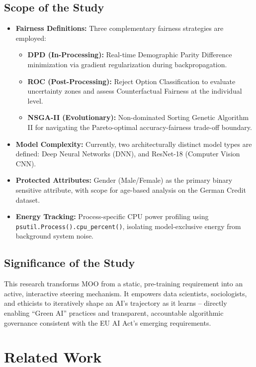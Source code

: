 \documentclass[12pt,a4paper]{article}
\begin{document}
\subsection{Scope of the Study}

\begin{itemize}
    \item \textbf{Fairness Definitions:} Three complementary fairness strategies are employed:
        \begin{itemize}
            \item \textbf{DPD (In-Processing):} Real-time Demographic Parity Difference minimization via gradient regularization during backpropagation.
            \item \textbf{ROC (Post-Processing):} Reject Option Classification to evaluate uncertainty zones and assess Counterfactual Fairness at the individual level.
            \item \textbf{NSGA-II (Evolutionary):} Non-dominated Sorting Genetic Algorithm II for navigating the Pareto-optimal accuracy-fairness trade-off boundary.
        \end{itemize}
    \item \textbf{Model Complexity:} Currently, two architecturally distinct model types are defined: Deep Neural Networks (DNN), and ResNet-18 (Computer Vision CNN).
    \item \textbf{Protected Attributes:} Gender (Male/Female) as the primary binary sensitive attribute, with scope for age-based analysis on the German Credit dataset.
    \item \textbf{Energy Tracking:} Process-specific CPU power profiling using \texttt{psutil.Process().cpu\_percent()}, isolating model-exclusive energy from background system noise.
\end{itemize}

\subsection{Significance of the Study}

This research transforms MOO from a static, pre-training requirement into an active, interactive steering mechanism. It empowers data scientists, sociologists, and ethicists to iteratively shape an AI's trajectory as it learns -- directly enabling ``Green AI'' practices and transparent, accountable algorithmic governance consistent with the EU AI Act's emerging requirements.
\section{Related Work}
\end{document}
